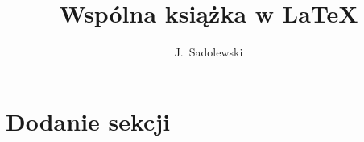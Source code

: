 \documentclass[12pt,a4paper]{book}
\author{J.~Sadolewski}
\title{Wspólna książka w \LaTeX{}}
\begin{document}
\maketitle

\section{Dodanie sekcji}


\end{document}
